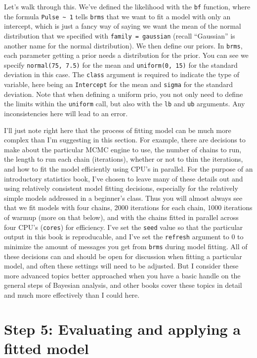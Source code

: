\documentclass[
]{book}
\begin{document}
Let's walk through this. We've defined the likelihood with the \texttt{bf} function, where the formula \texttt{Pulse\ \textasciitilde{}\ 1} tells \texttt{brms} that we want to fit a model with only an intercept, which is just a fancy way of saying we want the mean of the normal distribution that we specified with \texttt{family\ =\ gaussian} (recall ``Gaussian'' is another name for the normal distribution). We then define our priors. In \texttt{brms}, each parameter getting a prior needs a distribution for the prior. You can see we specify \texttt{normal(75,\ 7.5)} for the mean and \texttt{uniform(0,\ 15)} for the standard deviation in this case. The \texttt{class} argument is required to indicate the type of variable, here being an \texttt{Intercept} for the mean and \texttt{sigma} for the standard deviation. Note that when defining a uniform prio, you not only need to define the limits within the \texttt{uniform} call, but also with the \texttt{lb} and \texttt{ub} arguments. Any inconsistencies here will lead to an error.

I'll just note right here that the process of fitting model can be much more complex than I'm suggesting in this section. For example, there are decisions to make about the particular MCMC engine to use, the number of chains to run, the length to run each chain (iterations), whether or not to thin the iterations, and how to fit the model efficiently using CPU's in parallel. For the purpose of an introductory statistics book, I've chosen to leave many of these details out and using relatively consistent model fitting decisions, especially for the relatively simple models addressed in a beginner's class. Thus you will almost always see that we fit models with four chains, 2000 iterations for each chain, 1000 iterations of warmup (more on that below), and with the chains fitted in parallel across four CPU's (\texttt{cores}) for efficiency. I've set the \texttt{seed} value so that the particular output in this book is reproducable, and I've set the \texttt{refresh} argument to 0 to minimize the amount of messages you get from \texttt{brms} during model fitting. All of these decisions can and should be open for discussion when fitting a particular model, and often these settings will need to be adjusted. But I consider these more advanced topics better approached when you have a basic handle on the general steps of Bayesian analysis, and other books cover these topics in detail and much more effectively than I could here.

\section{Step 5: Evaluating and applying a fitted model}\label{step-5-evaluating-and-applying-a-fitted-model}
\end{document}
